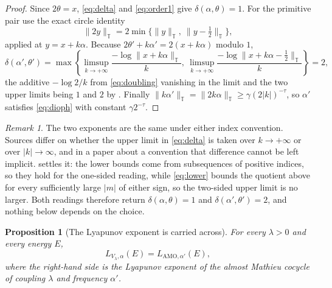 \documentclass[11pt,reqno]{amsart}
\theoremstyle{plain}
\newtheorem{proposition}[theorem]{Proposition}
\theoremstyle{definition}
\theoremstyle{remark}
\newtheorem{remark}[theorem]{Remark}
\numberwithin{equation}{section}
\begin{document}
\begin{proof}
  Since $2\theta=x$, \eqref{eq:delta} and \eqref{eq:order1} give
  $\delta(\alpha,\theta)=1$. For the primitive pair use the exact circle
  identity
  \begin{equation}
    \label{eq:doubling}
    \lVert 2y\rVert_{\mathbb T}
    =2\min\bigl\{\lVert y\rVert_{\mathbb T},\
                 \lVert y-\tfrac12\rVert_{\mathbb T}\bigr\},
  \end{equation}
  applied at $y=x+k\alpha$. Because $2\theta'+k\alpha'=2(x+k\alpha)$ modulo
  $1$,
  \begin{equation*}
    \delta(\alpha',\theta')
    =\max\left\{
      \limsup_{k\to+\infty}\frac{-\log\lVert x+k\alpha\rVert_{\mathbb T}}{k},\
      \limsup_{k\to+\infty}
        \frac{-\log\lVert x+k\alpha-\tfrac12\rVert_{\mathbb T}}{k}
    \right\}=2,
  \end{equation*}
  the additive $-\log2/k$ from \eqref{eq:doubling} vanishing in the limit and
  the two upper limits being $1$ and $2$ by . Finally
  $\lVert k\alpha'\rVert_{\mathbb T}=\lVert2k\alpha\rVert_{\mathbb T}
   \ge\gamma(2|k|)^{-\tau}$, so $\alpha'$ satisfies \eqref{eq:dioph} with
  constant $\gamma2^{-\tau}$.
\end{proof}

\begin{remark}
  \label{rem:index-set}
  The two exponents are the same under either index convention. Sources
  differ on whether the upper limit in \eqref{eq:delta} is taken over
  $k\to+\infty$ or over $|k|\to\infty$, and in a paper about a convention
  that difference cannot be left implicit. \Cref{prop:two-orders} settles it:
  the lower bounds come from subsequences of positive indices, so they hold
  for the one-sided reading, while \eqref{eq:lower} bounds the quotient above
  for every sufficiently large $|m|$ of either sign, so the two-sided upper
  limit is no larger. Both readings therefore return
  $\delta(\alpha,\theta)=1$ and $\delta(\alpha',\theta')=2$, and nothing below
  depends on the choice.
\end{remark}

\begin{proposition}[The Lyapunov exponent is carried across]
  \label{prop:lyapunov}
  For every $\lambda>0$ and every energy $E$,
  \begin{equation}
    \label{eq:lyap}
    L_{V_\lambda,\alpha}(E)=L_{\mathrm{AMO},\alpha'}(E),
  \end{equation}
  where the right-hand side is the Lyapunov exponent of the almost Mathieu
  cocycle of coupling $\lambda$ and frequency $\alpha'$.
\end{proposition}
\end{document}
